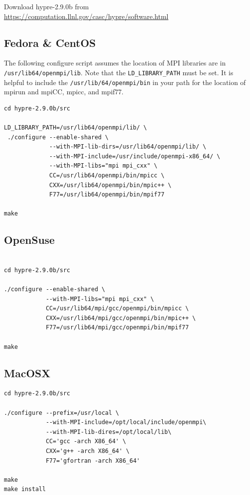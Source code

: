 \documentclass[12pt]{article}
\begin{document}
Download hypre-2.9.0b from
\url{https://computation.llnl.gov/casc/hypre/software.html}

\subsection{Fedora \& CentOS}

The following configure script assumes the location of MPI libraries
are in \texttt{/usr/lib64/openmpi/lib}.  Note that the
\texttt{LD\_LIBRARY\_PATH} must be set.  It is helpful to include the
\texttt{/usr/lib/64/openmpi/bin} in your path for the location of
mpirun and mpiCC, mpicc, and mpif77.


\begin{verbatim}
cd hypre-2.9.0b/src

LD_LIBRARY_PATH=/usr/lib64/openmpi/lib/ \
 ./configure --enable-shared \
             --with-MPI-lib-dirs=/usr/lib64/openmpi/lib/ \
             --with-MPI-include=/usr/include/openmpi-x86_64/ \
             --with-MPI-libs="mpi mpi_cxx" \
             CC=/usr/lib64/openmpi/bin/mpicc \
             CXX=/usr/lib64/openmpi/bin/mpic++ \
             F77=/usr/lib64/openmpi/bin/mpif77

make

\end{verbatim}

\subsection{OpenSuse}

\begin{verbatim}

cd hypre-2.9.0b/src

./configure --enable-shared \
            --with-MPI-libs="mpi mpi_cxx" \
            CC=/usr/lib64/mpi/gcc/openmpi/bin/mpicc \
            CXX=/usr/lib64/mpi/gcc/openmpi/bin/mpic++ \
            F77=/usr/lib64/mpi/gcc/openmpi/bin/mpif77

make

\end{verbatim}

\subsection{MacOSX}

\begin{verbatim}
cd hypre-2.9.0b/src

./configure --prefix=/usr/local \
            --with-MPI-include=/opt/local/include/openmpi\
            --with-MPI-lib-dires=/opt/local/lib\
            CC='gcc -arch X86_64' \
            CXX='g++ -arch X86_64' \
            F77='gfortran -arch X86_64' 

make
make install
\end{verbatim}
\end{document}
